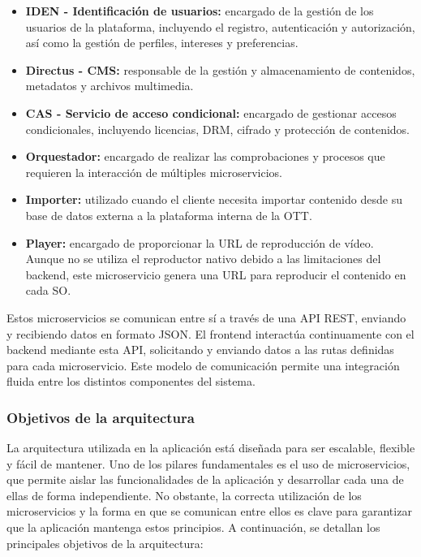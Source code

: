 \begin{itemize}
    \item \textbf{IDEN - Identificación de usuarios:} encargado de la gestión de los usuarios de la plataforma, 
    incluyendo el registro, autenticación y autorización, así como la gestión de perfiles, intereses y preferencias.
    
    \item \textbf{Directus - CMS:} responsable de la gestión y almacenamiento de contenidos, metadatos y archivos multimedia.

    \item \textbf{CAS - Servicio de acceso condicional:} encargado de gestionar accesos condicionales, incluyendo licencias, DRM, cifrado y protección de contenidos.

    \item \textbf{Orquestador:} encargado de realizar las comprobaciones y procesos que requieren la interacción de múltiples microservicios.

    \item \textbf{Importer:} utilizado cuando el cliente necesita importar contenido desde su base de datos externa a la plataforma interna de la OTT.

    \item \textbf{Player:} encargado de proporcionar la URL de reproducción de vídeo. Aunque no se utiliza el reproductor nativo debido a las limitaciones del backend, este microservicio genera una URL para reproducir el contenido en cada SO.
\end{itemize}

Estos microservicios se comunican entre sí a través de una API REST, enviando y recibiendo datos en formato JSON. 
El frontend interactúa continuamente con el backend mediante esta API, solicitando y enviando datos a las rutas 
definidas para cada microservicio. Este modelo de comunicación permite una integración fluida entre los distintos 
componentes del sistema.


\subsubsection{Objetivos de la arquitectura}
\label{subsec:diseno:ott:arquitectura_objetivos}

La arquitectura utilizada en la aplicación está diseñada para ser escalable, flexible y fácil de mantener. 
Uno de los pilares fundamentales es el uso de microservicios, que permite aislar las funcionalidades de la aplicación 
y desarrollar cada una de ellas de forma independiente. No obstante, la correcta utilización de los microservicios 
y la forma en que se comunican entre ellos es clave para garantizar que la aplicación mantenga estos principios. 
A continuación, se detallan los principales objetivos de la arquitectura:

